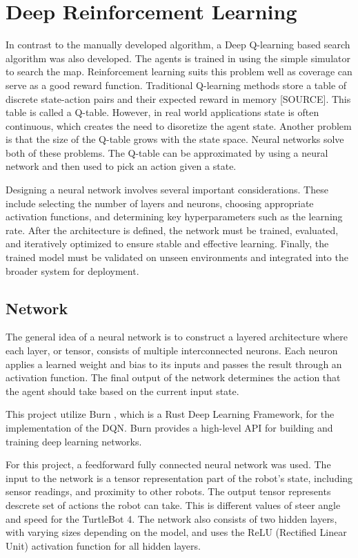 \section{Deep Reinforcement Learning}
In contrast to the manually developed algorithm, a Deep Q-learning based search algorithm was also developed. The agents is trained in using the simple simulator to search the map. Reinforcement learning suits this problem well as coverage can serve as a {\color{red} good} reward function. Traditional Q-learning methods store a table of discrete state-action pairs and their expected reward in memory {\color{red}[SOURCE]}. This table is called a Q-table. However, in real world applications state is often continuous, which creates the need to {\color{red} disoretize} the agent state. Another problem is that the size of the Q-table grows with the state space. Neural networks solve both of these problems. The Q-table can be approximated by using a neural network and then used to pick an action given a state.

Designing a neural network involves several important considerations. These include selecting the number of layers and neurons, choosing appropriate activation functions, and determining key hyperparameters such as the learning rate. After the architecture is defined, the network must be trained, evaluated, and iteratively optimized to ensure stable and effective learning. Finally, the trained model must be validated on unseen environments and integrated into the broader system for deployment.

\subsection{Network}
The general idea of a neural network is to construct a layered architecture where each layer, or tensor, consists of multiple interconnected neurons. Each neuron applies a learned weight and bias to its inputs and passes the result through an activation function. The final output of the network determines the action that the agent should take based on the current input state.

This project utilize Burn \cite{burn}, which is a Rust Deep Learning Framework, for the implementation of the DQN. Burn provides a high-level API for building and training deep learning networks.

For this project, a feedforward fully connected neural network was used. The input to the network is a tensor representation part of the robot’s state, including sensor readings, and proximity to other robots. 
The output tensor represents descrete set of actions the robot can take. This is different values of steer angle and speed for the TurtleBot 4.
The network also consists of two hidden layers, with varying sizes depending on the model, and uses the ReLU (Rectified Linear Unit) activation function for all hidden layers.

